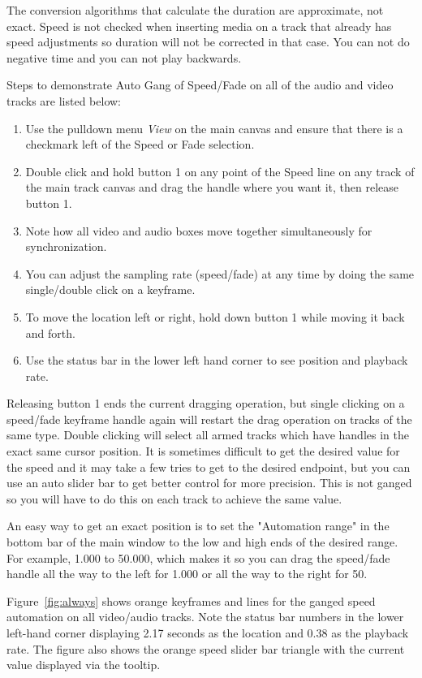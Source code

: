 The conversion algorithms that calculate the duration are approximate, not exact.   Speed is not checked when inserting media on a track that already has speed adjustments so duration will not be corrected in that case.  You can not do negative time and you can not play backwards.

Steps to demonstrate Auto Gang of Speed/Fade on all of the audio and video tracks are listed below:

\begin{enumerate}
    \item Use the pulldown menu \textit{View} on the main canvas and ensure that there is a checkmark left of the Speed or Fade selection.
    \item Double click and hold button 1 on any point of the Speed line on any track of the main track canvas and drag the handle where you want it, then release button 1.
    \item Note how all video and audio boxes move together simultaneously for synchronization.
    \item You can adjust the sampling rate (speed/fade) at any time by doing the same single/double
    click on a keyframe.
    \item To move the location left or right, hold down button 1 while moving it back and forth.
    \item Use the status bar in the lower left hand corner to see position and playback rate.
\end{enumerate}

Releasing button 1 ends the current dragging operation, but single clicking on a speed/fade keyframe handle again will restart the drag operation on tracks of the same type.  Double clicking will select all armed tracks which have handles in the exact same cursor position.  It is sometimes difficult to get the desired value for the speed and it may take a few tries to get to the desired endpoint, but you can use an auto slider bar to get better control for more precision.  This is not ganged so you will have to do this on each track to achieve the same value.

An easy way to get an exact position is to set the "Automation range" in the bottom bar of the main
window to the low and high ends of the desired range. For example, 1.000 to 50.000, which makes it
so you can drag the speed/fade handle all the way to the left for 1.000 or all the way to the right for 50.

Figure~\ref{fig:always} shows orange keyframes and lines for the ganged speed automation on all video/audio tracks.
Note the status bar numbers in the lower left-hand corner displaying 2.17 seconds as the location and 0.38 as the playback rate. The figure also shows the orange speed slider bar triangle with the current value displayed via the tooltip.

